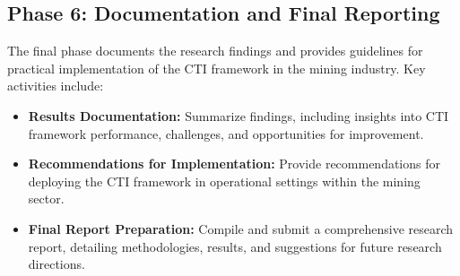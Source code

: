 \documentclass[a4paper,twoside,12pt]{report}
\begin{document}
\subsection{Phase 6: Documentation and Final Reporting}  
The final phase documents the research findings and provides guidelines for practical implementation of the CTI framework in the mining industry. Key activities include:
\begin{itemize}
    \item \textbf{Results Documentation:} Summarize findings, including insights into CTI framework performance, challenges, and opportunities for improvement.
    \item \textbf{Recommendations for Implementation:} Provide recommendations for deploying the CTI framework in operational settings within the mining sector.
    \item \textbf{Final Report Preparation:} Compile and submit a comprehensive research report, detailing methodologies, results, and suggestions for future research directions.
\end{itemize}
\end{document}
